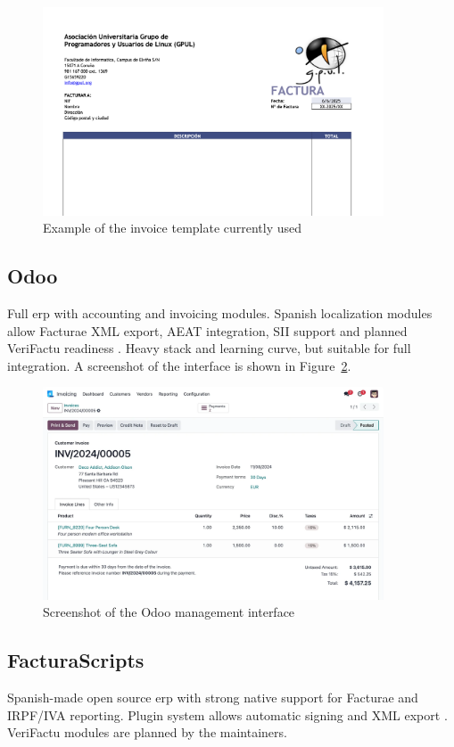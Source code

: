 \begin{figure}[h!]
  \centering
  \includegraphics[width=0.9\textwidth]{imaxes/invoice.png}
  \caption{Example of the invoice template currently used}
  \label{fig:invoice}
\end{figure}

\subsection*{Odoo}
Full \gls{erp} with accounting and invoicing modules. Spanish localization modules allow Facturae XML export, AEAT integration, SII support and planned VeriFactu readiness \cite{odoo-einvoice-spain}. Heavy stack and learning curve, but suitable for full integration. A screenshot of the interface is shown in Figure~\ref{fig:odoo-ui}.

\begin{figure}[h!]
  \centering
  \includegraphics[width=0.9\textwidth]{imaxes/odoo-ui.png}
  \caption{Screenshot of the Odoo management interface}
  \label{fig:odoo-ui}
\end{figure}

\subsection*{FacturaScripts}
Spanish-made open source \gls{erp} with strong native support for Facturae and IRPF/IVA reporting. Plugin system allows automatic signing and XML export \cite{facturascripts-antifraude}. VeriFactu modules are planned by the maintainers.


